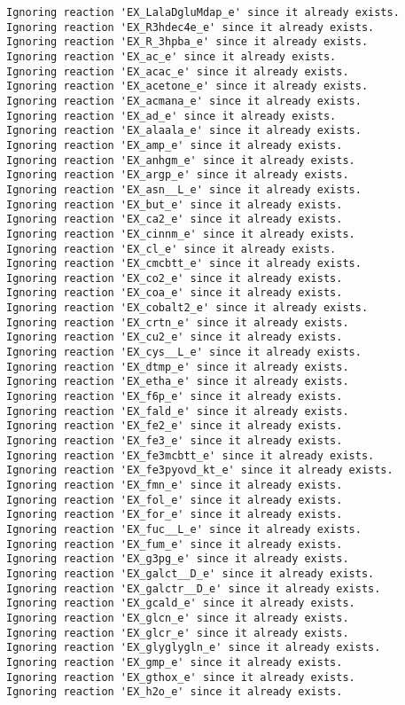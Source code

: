 \documentclass[
  letterpaper,
  DIV=11,
  numbers=noendperiod]{scrartcl}
\begin{document}
\begin{verbatim}
Ignoring reaction 'EX_LalaDgluMdap_e' since it already exists.
Ignoring reaction 'EX_R3hdec4e_e' since it already exists.
Ignoring reaction 'EX_R_3hpba_e' since it already exists.
Ignoring reaction 'EX_ac_e' since it already exists.
Ignoring reaction 'EX_acac_e' since it already exists.
Ignoring reaction 'EX_acetone_e' since it already exists.
Ignoring reaction 'EX_acmana_e' since it already exists.
Ignoring reaction 'EX_ad_e' since it already exists.
Ignoring reaction 'EX_alaala_e' since it already exists.
Ignoring reaction 'EX_amp_e' since it already exists.
Ignoring reaction 'EX_anhgm_e' since it already exists.
Ignoring reaction 'EX_argp_e' since it already exists.
Ignoring reaction 'EX_asn__L_e' since it already exists.
Ignoring reaction 'EX_but_e' since it already exists.
Ignoring reaction 'EX_ca2_e' since it already exists.
Ignoring reaction 'EX_cinnm_e' since it already exists.
Ignoring reaction 'EX_cl_e' since it already exists.
Ignoring reaction 'EX_cmcbtt_e' since it already exists.
Ignoring reaction 'EX_co2_e' since it already exists.
Ignoring reaction 'EX_coa_e' since it already exists.
Ignoring reaction 'EX_cobalt2_e' since it already exists.
Ignoring reaction 'EX_crtn_e' since it already exists.
Ignoring reaction 'EX_cu2_e' since it already exists.
Ignoring reaction 'EX_cys__L_e' since it already exists.
Ignoring reaction 'EX_dtmp_e' since it already exists.
Ignoring reaction 'EX_etha_e' since it already exists.
Ignoring reaction 'EX_f6p_e' since it already exists.
Ignoring reaction 'EX_fald_e' since it already exists.
Ignoring reaction 'EX_fe2_e' since it already exists.
Ignoring reaction 'EX_fe3_e' since it already exists.
Ignoring reaction 'EX_fe3mcbtt_e' since it already exists.
Ignoring reaction 'EX_fe3pyovd_kt_e' since it already exists.
Ignoring reaction 'EX_fmn_e' since it already exists.
Ignoring reaction 'EX_fol_e' since it already exists.
Ignoring reaction 'EX_for_e' since it already exists.
Ignoring reaction 'EX_fuc__L_e' since it already exists.
Ignoring reaction 'EX_fum_e' since it already exists.
Ignoring reaction 'EX_g3pg_e' since it already exists.
Ignoring reaction 'EX_galct__D_e' since it already exists.
Ignoring reaction 'EX_galctr__D_e' since it already exists.
Ignoring reaction 'EX_gcald_e' since it already exists.
Ignoring reaction 'EX_glcn_e' since it already exists.
Ignoring reaction 'EX_glcr_e' since it already exists.
Ignoring reaction 'EX_glyglygln_e' since it already exists.
Ignoring reaction 'EX_gmp_e' since it already exists.
Ignoring reaction 'EX_gthox_e' since it already exists.
Ignoring reaction 'EX_h2o_e' since it already exists.

\end{verbatim}
\end{document}
